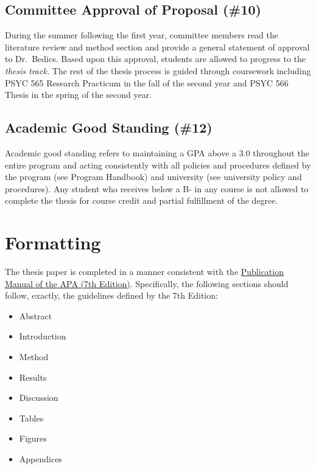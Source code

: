 \documentclass[]{book}
\providecommand{\tightlist}{%
  \setlength{\itemsep}{0pt}\setlength{\parskip}{0pt}}
\begin{document}
\hypertarget{committee-approval-of-proposal-10}{%
\section{Committee Approval of Proposal (\#10)}\label{committee-approval-of-proposal-10}}

During the summer following the first year, committee members read the literature review and method section and provide a general statement of approval to Dr.~Bedics. Based upon this approval, students are allowed to progress to the \emph{thesis track.} The rest of the thesis process is guided through coursework including PSYC 565 Research Practicum in the fall of the second year and PSYC 566 Thesis in the spring of the second year.

\hypertarget{academic-good-standing-12}{%
\section{Academic Good Standing (\#12)}\label{academic-good-standing-12}}

Academic good standing refers to maintaining a GPA above a 3.0 throughout the entire program and acting consistently with all policies and procedures defined by the program (see Program Handbook) and university (see university policy and procedures). Any student who receives below a B- in any course is not allowed to complete the thesis for course credit and partial fulfillment of the degree.

\hypertarget{formatting}{%
\chapter{Formatting}\label{formatting}}

The thesis paper is completed in a manner consistent with the \href{https://www.amazon.com/s?k=apa+publication+manual+7th+edition\&crid=7T10VJ2PYQZH\&sprefix=apa+pu\%2Caps\%2C261\&ref=nb_sb_ss_i_1_6}{Publication Manual of the APA (7th Edition)}. Specifically, the following sections should follow, exactly, the guidelines defined by the 7th Edition:

\begin{itemize}
\tightlist
\item
  Abstract
\item
  Introduction
\item
  Method
\item
  Results
\item
  Discussion
\item
  Tables
\item
  Figures
\item
  Appendices
\end{itemize}
\end{document}
